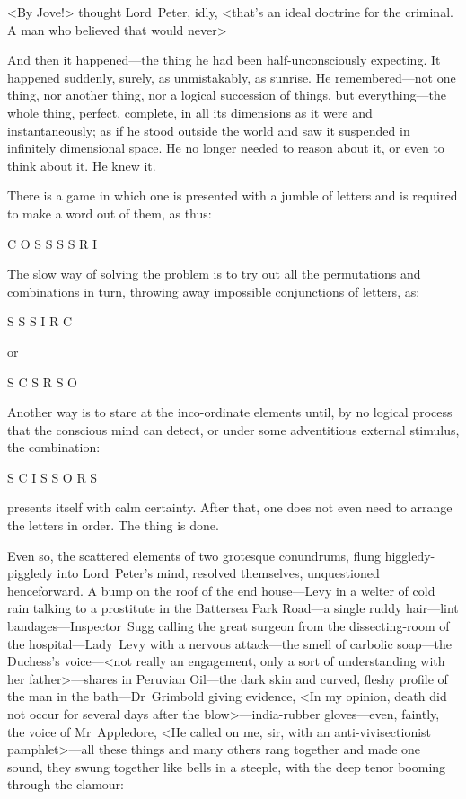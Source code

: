 <By Jove!> thought Lord~Peter, idly, <that's an ideal doctrine for the criminal. A man who believed that would never\longdash>

And then it happened—the thing he had been half-unconsciously expecting. It happened suddenly, surely, as unmistakably, as sunrise. He remembered—not one thing, nor another thing, nor a logical succession of things, but everything—the whole thing, perfect, complete, in all its dimensions as it were and instantaneously; as if he stood outside the world and saw it suspended in infinitely dimensional space. He no longer needed to reason about it, or even to think about it. He knew it.

There is a game in which one is presented with a jumble of letters and is required to make a word out of them, as thus:

\begin{center}
\textsc{C O S S S S R I}
\end{center}

The slow way of solving the problem is to try out all the permutations and combinations in turn, throwing away impossible conjunctions of letters, as:

\begin{center}
\textsc{S S S I R C}
\end{center}

or

\begin{center}
\textsc{S C S R S O}
\end{center}

Another way is to stare at the inco-ordinate elements until, by no logical process that the conscious mind can detect, or under some adventitious external stimulus, the combination:

\begin{center}
\textsc{S C I S S O R S}
\end{center}

presents itself with calm certainty. After that, one does not even need to arrange the letters in order. The thing is done.

Even so, the scattered elements of two grotesque conundrums, flung higgledy-piggledy into Lord~Peter's mind, resolved themselves, unquestioned henceforward. A bump on the roof of the end house—Levy in a welter of cold rain talking to a prostitute in the Battersea Park Road—a single ruddy hair—lint bandages—Inspector~Sugg calling the great surgeon from the dissecting-room of the hospital—Lady~Levy with a nervous attack—the smell of carbolic soap—the Duchess's voice—<not really an engagement, only a sort of understanding with her father>—shares in Peruvian Oil—the dark skin and curved, fleshy profile of the man in the bath—Dr~Grimbold giving evidence, <In my opinion, death did not occur for several days after the blow>—india-rubber gloves—even, faintly, the voice of Mr~Appledore, <He called on me, sir, with an anti-vivisectionist pamphlet>—all these things and many others rang together and made one sound, they swung together like bells in a steeple, with the deep tenor booming through the clamour:

